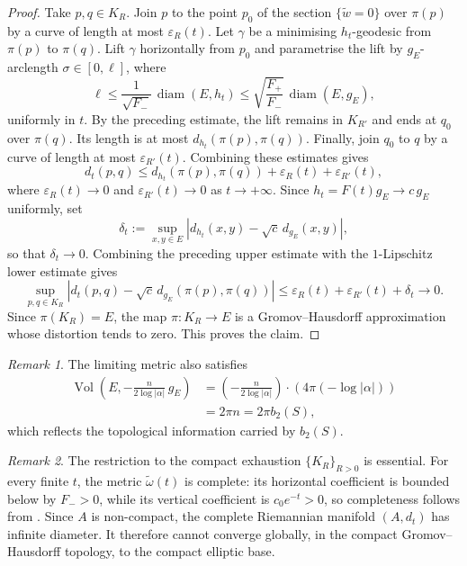 \documentclass[12pt]{amsart}
\numberwithin{equation}{section}
\theoremstyle{remark}
\newtheorem{remark}{Remark}
\theoremstyle{definition}
\begin{document}
\begin{proof}
Take $p,q\in K_R$. Join $p$ to the point $p_0$ of the section $\{\tilde w=0\}$ over $\pi(p)$ by a curve of length at most $\varepsilon_R(t)$. Let $\gamma$ be a minimising $h_t$-geodesic from $\pi(p)$ to $\pi(q)$. Lift $\gamma$ horizontally from $p_0$ and parametrise the lift by $g_E$-arclength $\sigma\in[0,\ell]$, where
$$\ell\leq\frac{1}{\sqrt{F_-}}\,\operatorname{diam}(E,h_t)\leq\sqrt{\frac{F_+}{F_-}}\,\operatorname{diam}(E,g_E),$$
uniformly in $t$.
By the preceding estimate, the lift remains in $K_{R'}$ and ends at $q_0$ over $\pi(q)$. Its length is at most $d_{h_t}(\pi(p),\pi(q))$. Finally, join $q_0$ to $q$ by a curve of length at most $\varepsilon_{R'}(t)$.
Combining these estimates gives
$$ d_t(p,q) \leq d_{h_t}(\pi(p),\pi(q)) + \varepsilon_R(t) + \varepsilon_{R'}(t), $$
where $\varepsilon_{R}(t)\to 0$ and $\varepsilon_{R'}(t)\to 0$ as $t\to+\infty$.
Since $h_t=F(t)g_E\to c\,g_E$ uniformly, set
$$\delta_t:=\sup_{x,y\in E}\left|d_{h_t}(x,y)-\sqrt c\,d_{g_E}(x,y)\right|,$$
so that $\delta_t\to0$. Combining the preceding upper estimate with the $1$-Lipschitz lower estimate gives
$$\sup_{p,q\in K_R}\left|d_t(p,q)-\sqrt c\,d_{g_E}(\pi(p),\pi(q))\right|\leq\varepsilon_R(t)+\varepsilon_{R'}(t)+\delta_t\longrightarrow0.$$
Since $\pi(K_R)=E$, the map $\pi:K_R\to E$ is a Gromov--Hausdorff approximation whose distortion tends to zero. This proves the claim.
\end{proof}


\begin{remark}
The limiting metric also satisfies
\begin{align*}
\operatorname{Vol}\left(E, -\frac{n}{2\log|\alpha|} \,g_E\right)
&= \left(-\frac{n}{2\log|\alpha|}\right) \cdot \left(4\pi(-\log|\alpha|)\right) \\
&= 2\pi n = 2\pi b_2(S),
\end{align*}
which reflects the topological information carried by $b_2(S)$.
\end{remark}

\begin{remark}
The restriction to the compact exhaustion $\{K_R\}_{R>0}$ is essential. For every finite $t$, the metric $\tilde\omega(t)$ is complete: its horizontal coefficient is bounded below by $F_->0$, while its vertical coefficient is $c_0e^{-t}>0$, so completeness follows from . Since $A$ is non-compact, the complete Riemannian manifold $(A,d_t)$ has infinite diameter. It therefore cannot converge globally, in the compact Gromov--Hausdorff topology, to the compact elliptic base.
\end{remark}
\end{document}
